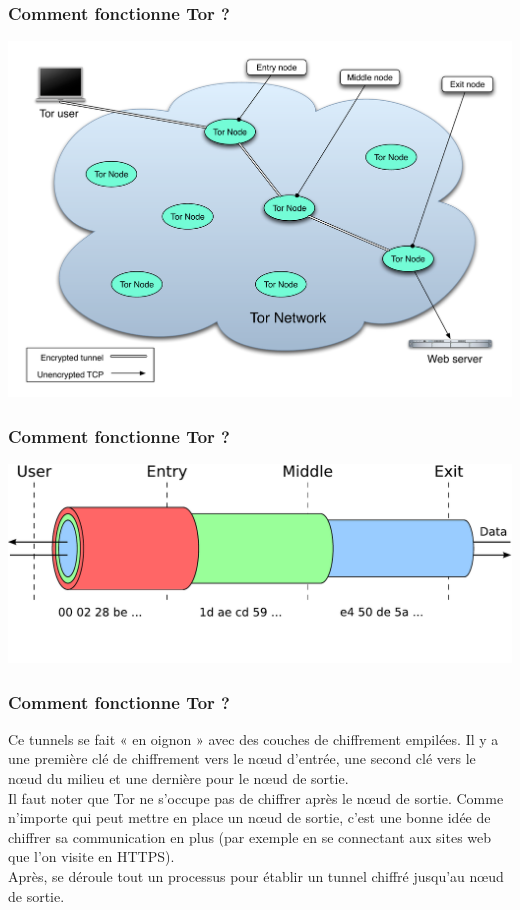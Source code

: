 \documentclass{beamer}
\begin{document}
\begin{frame}
\frametitle{Comment fonctionne Tor ?}
\begin{center}
\includegraphics[keepaspectratio,width=\textwidth, height=.8\textheight]{images/tor-safe-path}
\end{center}
\end{frame}
\begin{frame}
\frametitle{Comment fonctionne Tor ?}
\begin{center}
\includegraphics[keepaspectratio,width=\textwidth, height=.8\textheight]{images/tor-keys1}
\end{center}
\end{frame}
\begin{frame}
\frametitle{Comment fonctionne Tor ?}
Ce tunnels se fait « en oignon » avec des couches de chiffrement empilées. Il y a une première
clé de chiffrement vers le nœud d'entrée, une second clé vers le nœud du milieu et
une dernière pour le nœud de sortie.
\\
Il faut noter que Tor ne s'occupe pas de chiffrer après le nœud de sortie. Comme n'importe
qui peut mettre en place un nœud de sortie, c'est une bonne idée de chiffrer sa communication
en plus (par exemple en se connectant aux sites web que l'on visite en HTTPS).
\\
Après, se déroule tout un processus pour établir un tunnel chiffré jusqu'au
nœud de sortie.
\end{frame}
\end{document}
